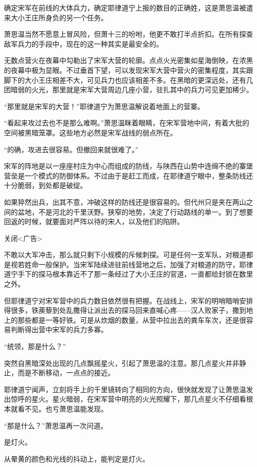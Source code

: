 确定宋军在前线的大体兵力，确定耶律道宁上报的数目的正确姓，这是萧思温被遣来大小王庄所身负的另一个任务。

萧思温当然不愿意上冒风险，但萧十三的吩咐，他更不敢打半点折扣。在所有探查敌军兵力的手段中，现在的这一种其实是最安全的。

无数点营火在夜幕中勾勒出了宋军大营的轮廓。点点火光密集如星海倒映，在浓黑的夜幕中极为显眼。不过垂首下望，可以发现宋军大营中营火的密集程度，其实跟脚下的大小王庄相差不大，可见兵力也应该相差不多。在黑暗的更深远处，还有几团暗弱的火光，那里就是宋军大营周边几座小营，驻扎其中的兵力可见更加稀少。

“那里就是宋军的大营！”耶律道宁为萧思温解说着地面上的营寨。

“看起来攻过去也不是那么难啊。”萧思温眯着眼睛，在宋军营地中间，有着大批的空间被黑暗笼罩。这些地方必然是宋军战线的弱点所在。

“的确，攻进去很容易。但撤回来就很难了。”

宋军的阵地是以一座座村庄为中心而组成的防线，与陕西在山势中连绵不绝的寨堡营垒是一个模式的防御体系。不过由于是赶工而成，在耶律道宁眼中，整条防线还十分脆弱，到处都是破绽。

如果猝然出兵，出其不意，冲破这样的防线还是很容易的。但代州只是夹在两山之间的盆地，不是河北的千里沃野。狭窄的地势，决定了行动路线的单一。到了想要回返的时候，就要面对严阵以待的宋人，以及他们的陷阱。

关闭<广告>

不敢以大军冲击，那么就只剩下小规模的斥候刺探。可是任何一支军队，对粮道都是视若姓命一般保护。当宋军陆续进驻前线营地之后，加强了对粮道的防守，耶律道宁手下的探马根本靠近不了那一条经过了大小王庄的官道，一直都给封锁在数里之外。

但耶律道宁对宋军营中的兵力数目依然很有把握。在战线上，宋军的明哨暗哨安排得很多，铁蒺藜到处乱撒得让派出去的探马回来直喊心疼——汉人败家子，撒到地上的那些都是一等好铁。可是从炊烟的数量，从营中拉出去的粪车车次，还是很容易判断得出营中宋军的兵力多寡。

“统领，那是什么？”

突然自黑暗深处出现的几点飘摇星火，引起了萧思温的注意。那几点星火并非静止，而是不断移动，一点点的接近。

耶律道宁闻声，立刻将手上的千里镜转向了相同的方向，很快就发现了让萧思温发出惊呼的星火。星火暗弱，在宋军营中明亮的火光照耀下，那几点星火不仔细看根本就看不见。也亏萧思温能发现。

“那是什么？”萧思温再一次问道。

是灯火。

从晕黄的颜色和光线的抖动上，能判定是灯火。

